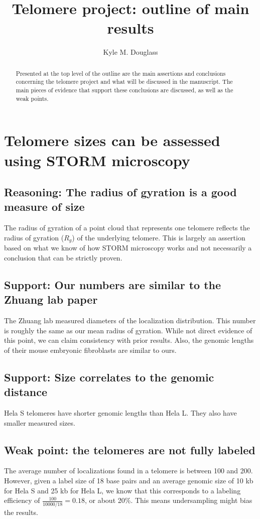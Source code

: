 \documentclass[12pt, a4paper]{article}
\author{Kyle M. Douglass}
\affil{Institute of Physics of Biological Systems, EPFL, Lausanne, Switzerland}
\date{}
\title{Telomere project: outline of main results}
\begin{document}
\maketitle
\setcounter{tocdepth}{2}
\tableofcontents

\begin{abstract}
Presented at the top level of the outline are the main assertions and
conclusions concerning the telomere project and what will be discussed
in the manuscript. The main pieces of evidence that support these
conclusions are discussed, as well as the weak points.
\end{abstract}


\section{Telomere sizes can be assessed using STORM microscopy}
\label{sec-1}

\subsection{Reasoning: The radius of gyration is a good measure of size}
\label{sec-1-1}
The radius of gyration of a point cloud that represents one
telomere reflects the radius of gyration ($R_g$) of the underlying
telomere. This is largely an assertion based on what we know of how
STORM microscopy works and not necessarily a conclusion that can be
strictly proven.

\subsection{Support: Our numbers are similar to the Zhuang lab paper}
\label{sec-1-2}
The Zhuang lab measured diameters of the localization
distribution. This number is roughly the same as our mean radius of
gyration. While not direct evidence of this point, we can claim
consistency with prior results. Also, the genomic lengths of their
mouse embryonic fibroblasts are similar to ours.

\subsection{Support: Size correlates to the genomic distance}
\label{sec-1-3}
Hela S telomeres have shorter genomic lengths than Hela L. They
also have smaller measured sizes.

\subsection{Weak point: the telomeres are not fully labeled}
\label{sec-1-4}
The average number of localizations found in a telomere is between
100 and 200. However, given a label size of 18 base pairs and an
average genomic size of 10 kb for Hela S and 25 kb for Hela L, we
know that this corresponds to a labeling efficiency of
$\frac{100}{10000 / 18} = 0.18$, or about 20\%. This means
undersampling might bias the results.
\end{document}
